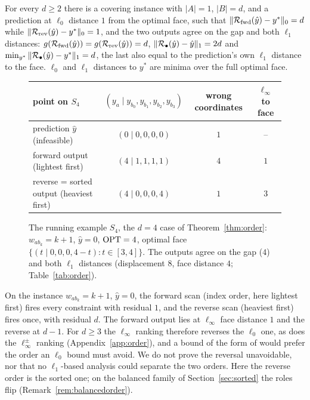 \begin{theorem}\label{thm:order}
For every $d \ge 2$ there is a covering instance with $|A| = 1$, $|B| = d$, and a prediction at
$\ell_0$ distance $1$ from the optimal face, such that
$\|\mathcal{R}_{\mathrm{fwd}}(\hat{y}) - y^*\|_0 = d$ while
$\|\mathcal{R}_{\mathrm{rev}}(\hat{y}) - y^*\|_0 = 1$, and the two outputs agree on the gap and both
$\ell_1$ distances:
$g(\mathcal{R}_{\mathrm{fwd}}(\hat{y})) = g(\mathcal{R}_{\mathrm{rev}}(\hat{y})) = d$,
$\|\mathcal{R}_{\bullet}(\hat{y}) - \hat{y}\|_1 = 2d$ and
$\min_{y^*}\|\mathcal{R}_{\bullet}(\hat{y}) - y^*\|_1 = d$, the last also equal to the prediction's own
$\ell_1$ distance to the face. $\ell_0$ and $\ell_1$ distances to $y^*$ are minima over the full
optimal face.
\end{theorem}

\begin{figure}[t]
\centering
\footnotesize
\setlength{\tabcolsep}{6pt}
\begin{tabular}{@{}lccc@{}}
\toprule
point on $S_4$ & $(y_a \mid y_{b_0}, y_{b_1}, y_{b_2}, y_{b_3})$ & wrong coordinates & $\ell_\infty$ to face\\
\midrule
prediction $\hat y$ (infeasible) & $(0 \mid 0,0,0,0)$ & $1$ & --\\
forward output (lightest first) & $(4 \mid 1,1,1,1)$ & $4$ & $1$\\
reverse = sorted output (heaviest first) & $(4 \mid 0,0,0,4)$ & $1$ & $3$\\
\bottomrule
\end{tabular}
\caption{The running example $S_4$, the $d = 4$ case of Theorem~\ref{thm:order}: $w_{ab_k} = k+1$,
$\hat y = 0$, $\mathrm{OPT} = 4$, optimal face $\{(t \mid 0,0,0,4-t) : t \in [3,4]\}$. The outputs agree
on the gap ($4$) and both $\ell_1$ distances (displacement $8$, face distance $4$;
Table~\ref{tab:order}).}
\label{fig:star}
\end{figure}

On the instance $w_{ab_k} = k+1$, $\hat y = 0$, the forward scan (index order, here lightest
first) fires every constraint with residual $1$, and the reverse scan (heaviest first) fires once,
with residual $d$. The forward output lies at $\ell_\infty$ face distance $1$ and the reverse at
$d-1$. For $d \ge 3$ the $\ell_\infty$ ranking therefore reverses the $\ell_0$ one, as does the
$\ell_\infty^\pm$ ranking (Appendix~\ref{app:order}), and a bound of the form of
\citet[Prop.~2]{sakaue2022} would prefer the order an $\ell_0$ bound must avoid. We do not prove
the reversal unavoidable, nor that no $\ell_1$-based analysis could separate the two orders. Here
the reverse order is the sorted one; on the balanced family of Section~\ref{sec:sorted} the roles
flip (Remark~\ref{rem:balancedorder}).

